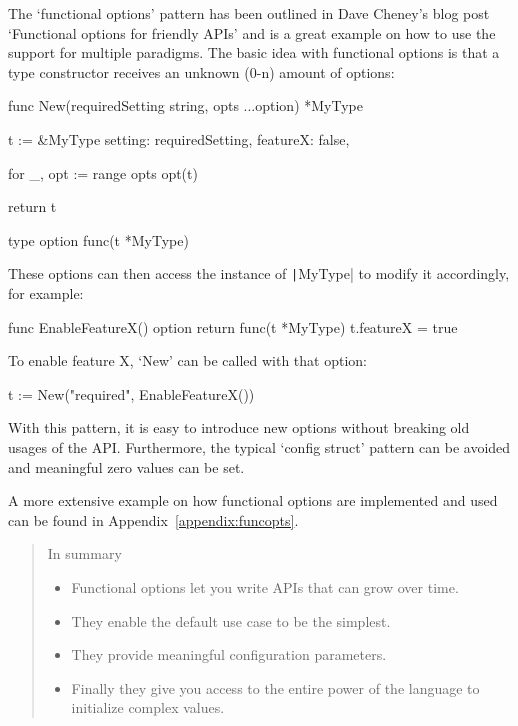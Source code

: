 The `functional options' pattern has been outlined in Dave Cheney's blog post `Functional options
for friendly APIs'\autocite{functional-options} and is a great example on how to use the support for multiple paradigms.
The basic idea with functional options is that a type constructor receives an unknown (0-n) amount
of options:
\begin{gocode}
func New(requiredSetting string, opts ...option) *MyType {
	t := &MyType{
		setting: requiredSetting,
		featureX: false,
	}

	for _, opt := range opts {
		opt(t)
	}

	return t
}

type option func(t *MyType)
\end{gocode}

These options can then access the instance of \texttt|MyType| to modify it accordingly,
for example:

\begin{gocode}
func EnableFeatureX() option {
	return func(t *MyType) {
		t.featureX = true
	}
}
\end{gocode}

To enable feature X, `New' can be called with that option:
\begin{gocode}
t := New("required", EnableFeatureX())
\end{gocode}

With this pattern, it is easy to introduce new options without breaking old usages of the API.
Furthermore, the typical `config struct' pattern can be avoided and meaningful zero values
can be set.

A more extensive example on how functional options are implemented and used can be found in
Appendix~\ref{appendix:funcopts}.

\begin{quote}
    In summary
    \begin{itemize}
        \item Functional options let you write APIs that can grow over time.
        \item They enable the default use case to be the simplest.
        \item They provide meaningful configuration parameters.
        \item Finally they give you access to the entire power of the language to initialize complex values.
    \end{itemize}\autocite{functional-options}
\end{quote}


